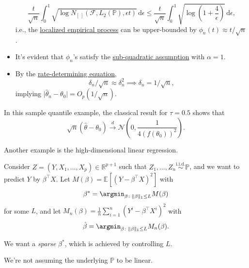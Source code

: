 \begin{explanation}
\begin{itemize}
		      \[
			      \frac{t}{\sqrt{n} } \int_{0}^{1} \sqrt{\log N_{[\ ]}(\mathscr{F} , L_2(\mathbb{P} ), \epsilon t)}  \,\mathrm{d}\epsilon
			      \leq \frac{t}{\sqrt{n} } \int_{0}^{1} \sqrt{\log \left( 1 + \frac{4}{\epsilon } \right) } \,\mathrm{d}\epsilon ,
		      \]
		      i.e., the \hyperref[def:localized-EP]{localized empirical process} can be upper-bounded by \(\phi _n(t) \approx t / \sqrt{n} \).
		\item It's evident that \(\phi _n\)'s satisfy the \hyperref[def:sub-quadratic-assumption]{sub-quadratic assumption} with \(\alpha = 1\).
		\item By the \hyperref[def:rate-determining-equation]{rate-determining equation},
		      \[
			      \delta _n / \sqrt{n} \approx \delta _n^2
			      \implies \delta _n = 1 / \sqrt{n},
		      \]
		      implying \(\vert \hat{\theta} _n - \theta _0 \vert = O_p (1 / \sqrt{n}) \).
	\end{itemize}
\end{explanation}

\begin{remark}
	In this sample quantile example, the classical result for \(\tau = 0.5\) shows that
	\[
		\sqrt{n} (\hat{\theta} - \theta _0) \overset{d}{\to } \mathcal{N} \left( 0, \frac{1}{4 ( f(\theta _0) )^2} \right).
	\]
\end{remark}

Another example is the high-dimensional linear regression.

\begin{eg}\label{eg:high-dim-LR}
	Consider \(Z = (Y, X_1, \dots , X_p) \in \mathbb{R} ^{p + 1}\) such that \(Z_1, \dots , Z_n \overset{\text{i.i.d.} }{\sim } \mathbb{P} \), and we want to predict \(Y\) by \(\beta ^{\top} X\). Let \(M(\beta ) = \mathbb{E}_{}\left[(Y - \beta ^{\top} X) ^2 \right] \) with
	\[
		\beta ^{\ast} = \argmin_{\beta \colon \lVert \beta \rVert _1 \leq L}  M(\beta )
	\]
	for some \(L\), and let \(M_n(\beta ) = \frac{1}{n} \sum_{i=1}^{n} (Y^i - \beta ^{\top} X^i)^2\) with
	\[
		\hat{\beta} = \argmin_{\beta \colon \lVert \beta  \rVert _1 \leq L} M_n(\beta ).
	\]

	\begin{intuition}
		We want a \emph{sparse} \(\beta ^{\ast} \), which is achieved by controlling \(L\).
	\end{intuition}

	\begin{note}
		We're not assuming the underlying \(\mathbb{P} \) to be linear.
	\end{note}
\end{eg}

